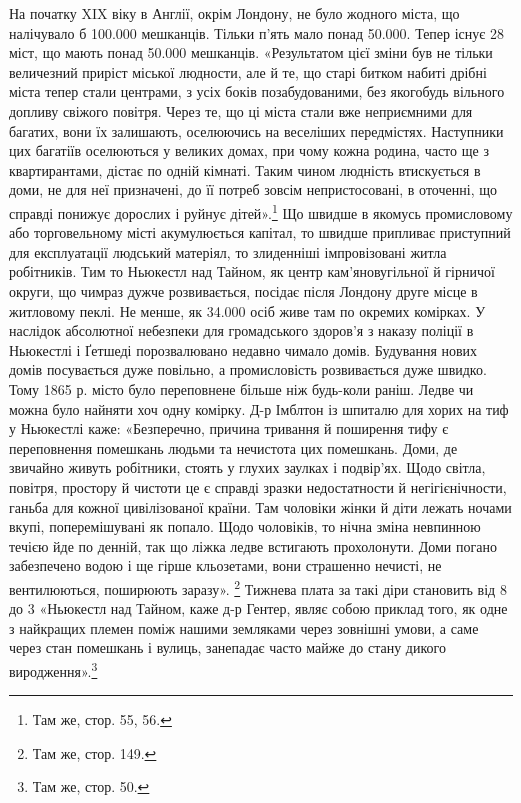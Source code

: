 На початку XIX віку в Англії, окрім Лондону, не було жодного
міста, що налічувало б \num{100.000} мешканців. Тільки п’ять
мало понад \num{50.000}. Тепер існує 28 міст, що мають понад \num{50.000} мешканців.
«Результатом цієї зміни був не тільки величезний приріст
міської людности, але й те, що старі битком набиті дрібні
міста тепер стали центрами, з усіх боків позабудованими, без
якогобудь вільного допливу свіжого повітря. Через те, що ці
міста стали вже неприємними для багатих, вони їх залишають,
оселюючись на веселіших передмістях. Наступники цих багатіїв
оселюються у великих домах, при чому кожна родина, часто ще
з квартирантами, дістає по одній кімнаті. Таким чином людність
втискується в доми, не для неї призначені, до її потреб зовсім
непристосовані, в оточенні, що справді понижує дорослих і руйнує
дітей».\footnote{
Там же, стор. 55, 56.
} Що швидше в якомусь промисловому або торговельному
місті акумулюється капітал, то швидше припливає
приступний для експлуатації людський матеріял, то злиденніші
імпровізовані житла робітників. Тим то Ньюкестл над Тайном,
як центр кам’яновугільної й гірничої округи, що чимраз дужче
розвивається, посідає після Лондону друге місце в житловому
пеклі. Не менше, як \num{34.000} осіб живе там по окремих комірках.
У наслідок абсолютної небезпеки для громадського здоров’я
з наказу поліції в Ньюкестлі і Ґетшеді порозвалювано недавно
чимало домів. Будування нових домів посувається дуже повільно,
а промисловість розвивається дуже швидко. Тому 1865 р.
місто було переповнене більше ніж будь-коли раніш. Ледве
чи можна було найняти хоч одну комірку. Д-р Імблтон із шпиталю
для хорих на тиф у Ньюкестлі каже: «Безперечно, причина
тривання й поширення тифу є переповнення помешкань людьми
та нечистота цих помешкань. Доми, де звичайно живуть робітники,
стоять у глухих заулках і подвір’ях. Щодо світла, повітря,
простору й чистоти це є справді зразки недостатности й негігієнічности,
ганьба для кожної цивілізованої країни. Там чоловіки
жінки й діти лежать ночами вкупі, поперемішувані як попало.
Щодо чоловіків, то нічна зміна невпинною течією йде по
денній, так що ліжка ледве встигають прохолонути. Доми погано
забезпечено водою і ще гірше кльозетами, вони страшенно нечисті,
не вентилюються, поширюють заразу». \footnote{
Там же, стор. 149.
} Тижнева плата
за такі діри становить від 8 до 3 «Ньюкестл
над Тайном, каже д-р Гентер, являє собою приклад того, як
одне з найкращих племен поміж нашими земляками через зовнішні
умови, а саме через стан помешкань і вулиць, занепадає
часто майже до стану дикого виродження».\footnote{
Там же, стор. 50.
}

